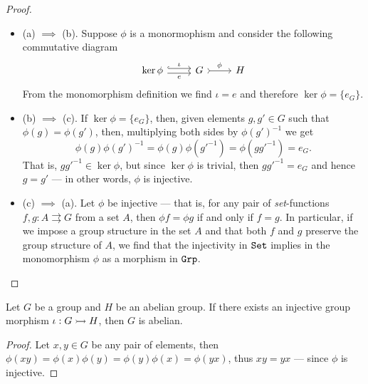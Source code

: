 \begin{proof}
    \begin{itemize}\setlength\itemsep{0em}
        \item (a) \(\implies\) (b). Suppose \(\phi\) is a monormophism and consider the
              following commutative diagram
              \[
                  \begin{tikzcd}
                      \ker \phi \ar[r, shift left, hook, "\iota"] \ar[r, shift right, swap, "e"]
                      & G \ar[r, tail, "\phi"] & H
                  \end{tikzcd}
              \]
              From the monomorphism definition we find \(\iota = e\) and therefore \(\ker \phi
              = \{e_G\}\).

        \item (b) \(\implies\) (c). If \(\ker\phi = \{e_G\}\), then, given elements \(g,
              g' \in G\) such that \(\phi(g) = \phi(g')\), then, multiplying both sides by
              \(\phi{(g')}^{-1}\) we get
              \[
                  \phi(g) {\phi(g')}^{-1} = \phi(g) \phi(g'^{-1}) = \phi(gg'^{-1}) = e_G.
              \]
              That is, \(gg'^{-1} \in \ker\phi\), but since \(\ker\phi\) is trivial, then
              \(gg'^{-1} = e_G\) and hence \(g = g'\) --- in other words, \(\phi\) is
              injective.

        \item (c) \(\implies\) (a). Let \(\phi\) be injective --- that is, for any pair
              of \emph{set}-functions \(f, g: A \rightrightarrows G\) from a set \(A\), then
              \(\phi f = \phi g\) if and only if \(f = g\). In particular, if we impose a
              group structure in the set \(A\) and that both \(f\) and \(g\) preserve the
              group structure of \(A\), we find that the injectivity in \({\texttt{Set}}\) implies in
              the monomorphism \(\phi\) as a morphism in \({\texttt{Grp}}\).
    \end{itemize}
\end{proof}

\begin{proposition}
    \label{prop:injective-morphism-abelian}
    Let \(G\) be a group and \(H\) be an abelian group. If there exists an injective
    group morphism \(\iota: G \rightarrowtail H\), then \(G\) is abelian.
\end{proposition}

\begin{proof}
    Let \(x, y \in G\) be any pair of elements, then \(\phi(x y) = \phi(x) \phi(y) =
    \phi(y) \phi(x) = \phi(y x)\), thus \(x y = y x\) --- since \(\phi\) is
    injective.
\end{proof}

